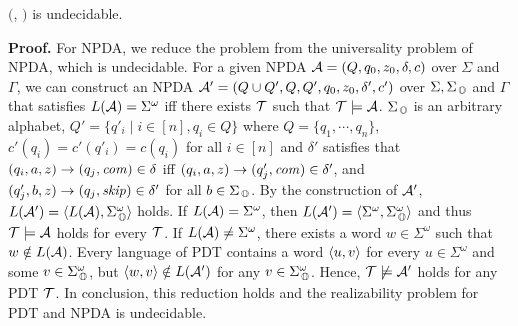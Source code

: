 \begin{theorem}
\label{th: NPDA-PDT}
\Real $($\NPDA, \PDT$)$ is undecidable.
\end{theorem}
{\bf Proof.}\quad
For NPDA, we reduce the problem from the universality problem of NPDA, which is undecidable.
For a given NPDA ${\cal A} = (Q, q_0, z_0, \delta, c)$ over $\Sigma$ and $\Gamma$,
we can construct an NPDA ${\cal A}' = (Q\cup Q', Q, Q', q_0, z_0, \delta',c')$ over $\Sigma, \Sigma_{\, \mathbb{O}}$ and $\Gamma$ that satisfies
$L({\cal A})=\Sigma^\omega$ iff there exists ${\cal T}$ such that ${\cal T}\models{\cal A}$.
$\Sigma_{\, \mathbb{O}}$ is an arbitrary alphabet,
$Q'=\{q'_i\mid i\in[n], q_i\in Q\}$ where $Q=\{q_1,\cdots,q_n\}$,
$c'(q_i)=c'(q'_i)=c(q_i)$ for all $i\in[n]$
and $\delta'$ satisfies that
$(q_i,a,z)\to (q_j,\mathit{com})\in\delta$ iff $(q_i,a,z)\to (q'_j,\mathit{com})\in\delta'$, and
$(q'_j,b,z)\to (q_j,\mathit{skip})\in\delta'$ for all $b\in \Sigma_{\, \mathbb{O}}$.
By the construction of ${\cal A}'$, $L({\cal A}')=\langle L({\cal A}),\Sigma_{\, \mathbb{O}}^\omega\rangle$ holds.
If $L({\cal A})=\Sigma^\omega$, then $L({\cal A}')=\langle\Sigma^\omega,\Sigma_{\, \mathbb{O}}^\omega\rangle$
and thus ${\cal T}\models{\cal A}$ holds for every ${\cal T}$.
If $L({\cal A})\neq\Sigma^\omega$, there exists a word $w\in\Sigma^\omega$ such that $w\notin L({\cal A})$.
Every language of PDT contains a word $\langle u, v\rangle$ for every $u\in\Sigma^\omega$ and some $v\in\Sigma_{\, \mathbb{O}}^\omega$, but $\langle w, v\rangle\notin L({\cal A}')$ for any $v\in\Sigma_{\, \mathbb{O}}^\omega$.
Hence, ${\cal T}\not\models{\cal A}'$ holds for any PDT ${\cal T}$.
In conclusion, this reduction holds and the realizability problem for PDT and NPDA is undecidable.
